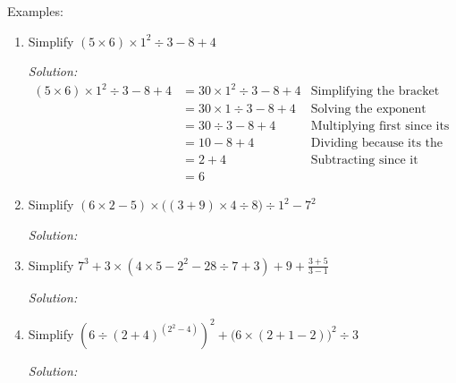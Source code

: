 \documentclass[16pt]{article}
\theoremstyle{remark}
\begin{document}
Examples:
\begin{enumerate}
\item Simplify $(5\times 6)\times1^2 \div3-8+4$
\begin{mdframed}[style=TheoremFrame]
\textit{Solution:}\\

\begin{align*}
(5\times 6)\times1^2 \div3-8+4 &= 30 \times1^2 \div3-8+4 & \text{Simplifying the bracket}\\
&= 30 \times1 \div3-8+4 & \text{Solving the exponent}\\
&= 30 \div 3 -8+4 &\text{Multiplying first since its on the left}\\
&= 10 - 8 + 4 & \text{Dividing because its the highest priority}\\
&= 2+4 & \text{Subtracting since it comes first from the left}\\
&= 6 &
\end{align*}
\end{mdframed}
\item Simplify $(6\times 2 - 5) \times \big((3+9)\times 4 \div 8 \big) \div 1^2-7^2$
\begin{mdframed}[style=TheoremFrame]
\textit{Solution:}\\

\end{mdframed}
\item Simplify $\displaystyle{7^3 + 3\times (4 \times 5 - 2^2 -28 \div 7 +3) + 9 + \frac{3+5}{3-1}}$
\begin{mdframed}[style=TheoremFrame]
\textit{Solution:}\\

\end{mdframed}
\item Simplify $\displaystyle{(6\div (2+4)^{(2^2-4)})^2 + \big(6\times(2+1-2)\big)^2 \div 3}$
\begin{mdframed}[style=TheoremFrame]
\textit{Solution:}\\

\end{mdframed}
\end{enumerate}
\end{document}
